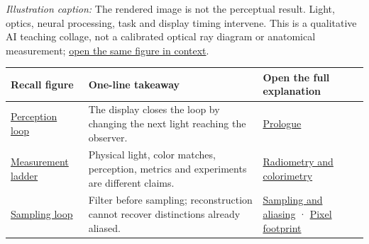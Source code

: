 \emph{Illustration caption:} The rendered image is not the perceptual result. Light, optics, neural processing, task and display timing intervene. This is a qualitative AI teaching collage, not a calibrated optical ray diagram or anatomical measurement; \href{Continuous\%20Notes/University\%20-\%20Worlds,\%20Images\%20and\%20Inference\%20-\%20Graphics,\%20Vision\%20and\%20Photography\#Figure\%20X0\%20—\%20A\%20qualitative\%20picture\%20of\%20the\%20XR\%20loop}{open the same figure in context}.

{\def\LTcaptype{none} %
\begin{longtable}[]{@{}
  >{\raggedright\arraybackslash}p{}
  >{\raggedright\arraybackslash}p{}
  >{\raggedright\arraybackslash}p{}@{}}
\toprule\noalign{}
\begin{minipage}[b]{\linewidth}\raggedright
Recall figure
\end{minipage} & \begin{minipage}[b]{\linewidth}\raggedright
One-line takeaway
\end{minipage} & \begin{minipage}[b]{\linewidth}\raggedright
Open the full explanation
\end{minipage} \\
\midrule\noalign{}
\endhead
\bottomrule\noalign{}
\endlastfoot
\hyperref[Fromux20emittedux20lightux20toux20aux20perceptualux20claimux2f]{Perception loop} & The display closes the loop by changing the next light reaching the observer. & \href{Continuous\%20Notes/University\%20-\%20Worlds,\%20Images\%20and\%20Inference\%20-\%20Graphics,\%20Vision\%20and\%20Photography\#Prologue\%20-\%20A\%20perfect\%20scene\%20can\%20still\%20make\%20a\%20poor\%20experience/}{Prologue} \\
\hyperref[Fourux20measurementux20familiesux20thatux20mustux20notux20beux20collapsedux2f]{Measurement ladder} & Physical light, color matches, perception, metrics and experiments are different claims. & \href{Continuous\%20Notes/University\%20-\%20Worlds,\%20Images\%20and\%20Inference\%20-\%20Graphics,\%20Vision\%20and\%20Photography\#Light\%20must\%20become\%20a\%20quantity\%20before\%20it\%20becomes\%20a\%20color/}{Radiometry and colorimetry} \\
\hyperref[Samplingux20andux20filtering:ux20preserveux20whatux20canux20beux20distinguishedux2f]{Sampling loop} & Filter before sampling; reconstruction cannot recover distinctions already aliased. & \href{Continuous\%20Notes/University\%20-\%20Worlds,\%20Images\%20and\%20Inference\%20-\%20Graphics,\%20Vision\%20and\%20Photography\#Sampling\%20is\%20a\%20question\%20of\%20what\%20remains\%20distinguishable/}{Sampling and aliasing} · \href{Continuous\%20Notes/University\%20-\%20Worlds,\%20Images\%20and\%20Inference\%20-\%20Graphics,\%20Vision\%20and\%20Photography\#A\%20footprint\%20is\%20more\%20meaningful\%20than\%20an\%20isolated\%20pixel\%20center/}{Pixel footprint} \\

\end{longtable}}
